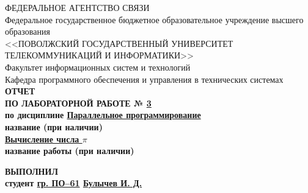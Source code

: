 \begin{titlepage}
	\begin{spacing}{1.1}
		\begin{center}		
			ФЕДЕРАЛЬНОЕ АГЕНТСТВО СВЯЗИ 
			\\
			Федеральное государственное бюджетное образовательное учреждение высшего образования
			\\
			<<ПОВОЛЖСКИЙ ГОСУДАРСТВЕННЫЙ УНИВЕРСИТЕТ ТЕЛЕКОММУНИКАЦИЙ И ИНФОРМАТИКИ>>
			\\			
			\vspace{1em}
			Факультет информационных систем и технологий
			\\
			Кафедра программного обеспечения и управления в технических системах
			\\
			\vspace{7em}
			\bfseries\Large
			ОТЧЕТ
			\\
			ПО ЛАБОРАТОРНОЙ РАБОТЕ № \underline{\hspace{0.4em}3\hspace{0.4em}}
			\\
			\vspace{0.5em}
			\normalfont
			\normalsize
			по дисциплине
			\underline{\hspace{4em}Параллельное программирование\hspace{4em}}
			\\
			\small
			\hspace{4em} название (при наличии)
			\normalsize
			\\
			\hspace{3em}			
			\underline{\hspace{3em}Вычисление числа $\pi$ \hspace{3em}}
			\\
			\small
			\hspace{4em} название работы (при наличии)
			\normalsize
			\\		
	\end{center}			
			\vspace{5em}
			\begin{minipage}{0.5\textwidth}
				\begin{flushleft}					
				\end{flushleft}
			\end{minipage}
			\begin{minipage}{0.5\textwidth}
				\begin{center}
					\bfseries
					ВЫПОЛНИЛ
					\\
					\normalfont
					студент \hspace{1ex} \underline{гр. ПО--61} \hspace{1ex} \underline{Булычев И. Д.}

\end{center}
\end{minipage}
\end{spacing}
\end{titlepage}
